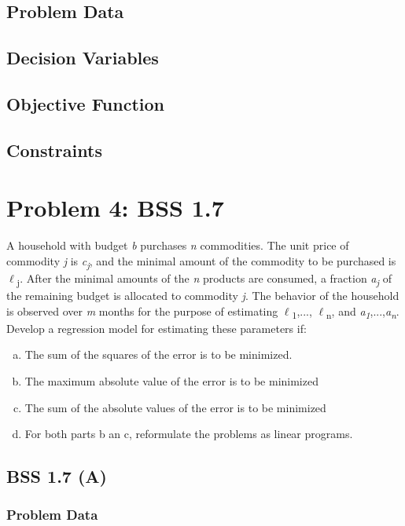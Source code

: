 \documentclass[12pt]{article}
\begin{document}
\subsection{Problem Data}

\subsection{Decision Variables}

\subsection{Objective Function}

\subsection{Constraints}


\section{Problem 4: BSS 1.7}
A household with budget \textit{b} purchases \textit{n} commodities. The unit price of commodity \textit{j} is \textit{c\textsubscript{j}}, and the minimal amount of the commodity to be purchased is $\ell$\textsubscript{j}. After the minimal amounts of the \textit{n} products are consumed, a fraction \textit{a\textsubscript{j}} of the remaining budget is allocated to commodity \textit{j}. The behavior of the household is observed over \textit{m} months for the purpose of estimating $\ell$\textsubscript{1},..., $\ell$\textsubscript{n}, and \textit{a\textsubscript{1}},...,\textit{a\textsubscript{n}}. Develop a regression model for estimating these parameters if:
\begin{enumerate}[(a)]
\item The sum of the squares of the error is to be minimized.
\item The maximum absolute value of the error is to be minimized
\item The sum of the absolute values of the error is to be minimized
\item For both parts b an c, reformulate the problems as linear programs.
\end{enumerate}

\subsection{BSS 1.7 (A)}
\subsubsection{Problem Data}
\end{document}

